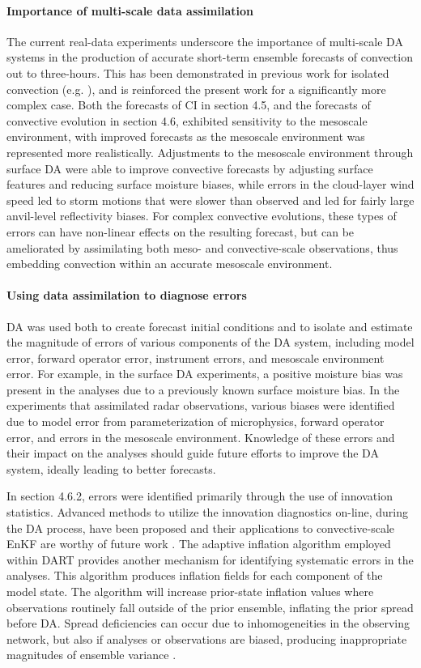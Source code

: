 \paragraph{Importance of multi-scale data assimilation}
The current real-data experiments underscore the importance of multi-scale DA systems in the production of accurate short-term ensemble forecasts of convection out to three-hours. This has been demonstrated in previous work for isolated convection (e.g. \citealt{stensrudgao10}), and is reinforced the present work for a significantly more complex case. Both the forecasts of CI in section 4.5, and the forecasts of convective evolution in section 4.6, exhibited sensitivity to the mesoscale environment, with improved forecasts as the mesoscale environment was represented more realistically. Adjustments to the mesoscale environment through surface DA were able to improve convective forecasts by adjusting surface features and reducing surface moisture biases, while errors in the cloud-layer wind speed led to storm motions that were slower than observed and led for fairly large anvil-level reflectivity biases. For complex convective evolutions, these types of errors can have non-linear effects on the resulting forecast, but can be ameliorated by assimilating both meso- and convective-scale observations, thus embedding convection within an accurate mesoscale environment.

\paragraph{Using data assimilation to diagnose errors}
DA was used both to create forecast initial conditions and to isolate and estimate the magnitude of errors of various components of the DA system, including model error, forward operator error, instrument errors, and mesoscale environment error. For example, in the surface DA experiments, a positive moisture bias was present in the analyses due to a previously known surface moisture bias. In the experiments that assimilated radar observations, various biases were identified due to model error from parameterization of microphysics, forward operator error, and errors in the mesoscale environment. Knowledge of these errors and their impact on the analyses should guide future efforts to improve the DA system, ideally leading to better forecasts.

In section 4.6.2, errors were identified primarily through the use of innovation statistics. Advanced methods to utilize the innovation diagnostics on-line, during the DA process, have been proposed and their applications to convective-scale EnKF are worthy of future work \citep{deedasilva98}. The adaptive inflation algorithm employed within DART provides another mechanism for identifying systematic errors in the analyses. This algorithm produces inflation fields for each component of the model state. The algorithm will increase prior-state inflation values where observations routinely fall outside of the prior ensemble, inflating the prior spread before DA. Spread deficiencies can occur due to inhomogeneities in the observing network, but also if analyses or observations are biased, producing inappropriate magnitudes of ensemble variance \citep{anderson09}.

